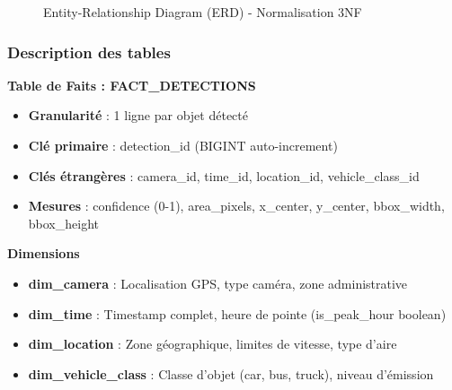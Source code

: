 \begin{figure}[H]
    \caption{Entity-Relationship Diagram (ERD) - Normalisation 3NF}
    \label{fig:erd-circuli}
\end{figure}

\subsubsection{Description des tables}

\textbf{Table de Faits : FACT\_DETECTIONS}
\begin{itemize}
    \item \textbf{Granularité} : 1 ligne par objet détecté
    \item \textbf{Clé primaire} : detection\_id (BIGINT auto-increment)
    \item \textbf{Clés étrangères} : camera\_id, time\_id, location\_id, vehicle\_class\_id
    \item \textbf{Mesures} : confidence (0-1), area\_pixels, x\_center, y\_center, bbox\_width, bbox\_height
\end{itemize}

\textbf{Dimensions}
\begin{itemize}
    \item \textbf{dim\_camera} : Localisation GPS, type caméra, zone administrative
    \item \textbf{dim\_time} : Timestamp complet, heure de pointe (is\_peak\_hour boolean)
    \item \textbf{dim\_location} : Zone géographique, limites de vitesse, type d'aire
    \item \textbf{dim\_vehicle\_class} : Classe d'objet (car, bus, truck), niveau d'émission
\end{itemize}


